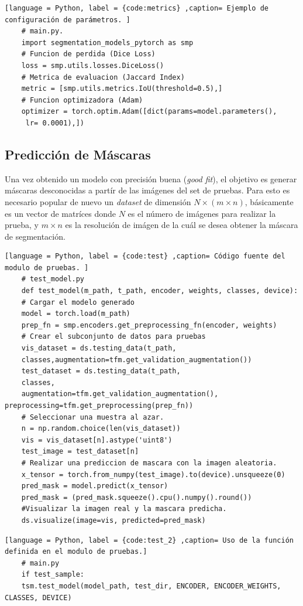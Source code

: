 \begin{lstlisting}[language = Python, label = {code:metrics} ,caption= Ejemplo de configuración de parámetros. ]
    # main.py.
    import segmentation_models_pytorch as smp
    # Funcion de perdida (Dice Loss)
    loss = smp.utils.losses.DiceLoss() 
    # Metrica de evaluacion (Jaccard Index)
    metric = [smp.utils.metrics.IoU(threshold=0.5),]
    # Funcion optimizadora (Adam)
    optimizer = torch.optim.Adam([dict(params=model.parameters(),
     lr= 0.0001),])
\end{lstlisting}

\subsection{Predicción de Máscaras} 
Una vez obtenido un modelo con precisión buena (\emph{good fit}), el objetivo es generar máscaras desconocidas a partír de las imágenes del set de pruebas. Para esto es necesario popular de nuevo un \emph{dataset} de dimensión $N \times (m \times n)$, básicamente es un vector de matríces donde $N$ es el número de imágenes para realizar la prueba, y $m \times n$ es la resolución de imágen de la cuál se desea obtener la máscara de segmentación.

\begin{lstlisting}[language = Python, label = {code:test} ,caption= Código fuente del modulo de pruebas. ]
    # test_model.py
    def test_model(m_path, t_path, encoder, weights, classes, device):
    # Cargar el modelo generado
    model = torch.load(m_path)
    prep_fn = smp.encoders.get_preprocessing_fn(encoder, weights)
    # Crear el subconjunto de datos para pruebas
    vis_dataset = ds.testing_data(t_path,
    classes,augmentation=tfm.get_validation_augmentation())
    test_dataset = ds.testing_data(t_path,
    classes, 
    augmentation=tfm.get_validation_augmentation(), preprocessing=tfm.get_preprocessing(prep_fn))
    # Seleccionar una muestra al azar.
    n = np.random.choice(len(vis_dataset))
    vis = vis_dataset[n].astype('uint8')
    test_image = test_dataset[n]
    # Realizar una prediccion de mascara con la imagen aleatoria.
    x_tensor = torch.from_numpy(test_image).to(device).unsqueeze(0)
    pred_mask = model.predict(x_tensor)
    pred_mask = (pred_mask.squeeze().cpu().numpy().round())
    #Visualizar la imagen real y la mascara predicha.
    ds.visualize(image=vis, predicted=pred_mask)
\end{lstlisting}

\begin{lstlisting}[language = Python, label = {code:test_2} ,caption= Uso de la función definida en el modulo de pruebas.]
    # main.py
    if test_sample:
    tsm.test_model(model_path, test_dir, ENCODER, ENCODER_WEIGHTS, CLASSES, DEVICE)
\end{lstlisting}

